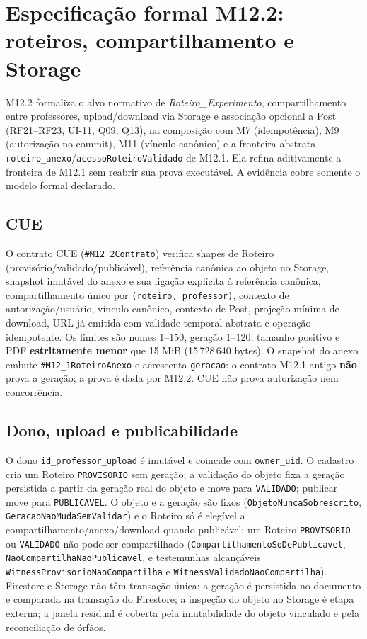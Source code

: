 \clearpage
\section{Especificação formal M12.2: roteiros, compartilhamento e Storage}
\label{sec:formal-m12-2}
\sloppy

M12.2 formaliza o alvo normativo de \textit{Roteiro\_Experimento},
compartilhamento entre professores, upload/download via Storage e associação
opcional a Post (RF21--RF23, UI-11, Q09, Q13), na composição com M7
(idempotência), M9 (autorização no commit), M11 (vínculo canônico) e a fronteira
abstrata \texttt{roteiro\_anexo}/\texttt{acessoRoteiroValidado} de M12.1. Ela
refina aditivamente a fronteira de M12.1 sem reabrir sua prova executável. A
evidência cobre somente o modelo formal declarado.

\subsection*{CUE}
O contrato CUE (\texttt{\#M12\_2Contrato}) verifica shapes de Roteiro
(provisório/validado/publicável), referência canônica ao objeto no Storage,
snapshot imutável do anexo e sua ligação explícita à referência canônica,
compartilhamento único por \texttt{(roteiro, professor)}, contexto de
autorização/usuário, vínculo canônico, contexto de Post, projeção mínima de
download, URL já emitida com validade temporal abstrata e operação idempotente.
Os limites são nomes 1--150, geração 1--120, tamanho positivo e PDF
\textbf{estritamente menor} que 15 MiB (15\,728\,640 bytes). O snapshot do anexo
embute \texttt{\#M12\_1RoteiroAnexo} e acrescenta \texttt{geracao}: o contrato
M12.1 antigo \textbf{não} prova a geração; a prova é dada por M12.2. CUE não
prova autorização nem concorrência.

\subsection*{Dono, upload e publicabilidade}
O dono \texttt{id\_professor\_upload} é imutável e coincide com \texttt{owner\_uid}.
O cadastro cria um Roteiro \texttt{PROVISORIO} sem geração; a validação do objeto
fixa a geração persistida a partir da geração real do objeto e move para
\texttt{VALIDADO}; publicar move para \texttt{PUBLICAVEL}. O objeto e a geração
são fixos (\texttt{ObjetoNuncaSobrescrito}, \texttt{GeracaoNaoMudaSemValidar}) e
o Roteiro só é elegível a compartilhamento/anexo/download quando publicável:
um Roteiro \texttt{PROVISORIO} ou \texttt{VALIDADO} não pode ser compartilhado
(\texttt{CompartilhamentoSoDePublicavel}, \texttt{NaoCompartilhaNaoPublicavel},
e testemunhas alcançáveis \texttt{WitnessProvisorioNaoCompartilha} e
\texttt{WitnessValidadoNaoCompartilha}).
Firestore e Storage não têm transação única: a geração é persistida no documento
e comparada na transação do Firestore; a inspeção do objeto no Storage é etapa
externa; a janela residual é coberta pela imutabilidade do objeto vinculado e
pela reconciliação de órfãos.

